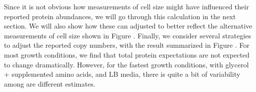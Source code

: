 \begin{figure}
\end{figure}

Since it is not obvious how measurements of cell size might have influenced
their reported protein abundances, we will go through this calculation in the
next section. We will also show how these can adjusted to better reflect the
alternative measurements of cell size shown in Figure
. Finally, we consider several strategies to
adjust the reported copy numbers, with the result summarized in Figure
. For most growth conditions, we find that
total protein expectations are not expected to change dramatically. However, for
the fastest growth conditions, with glycerol + supplemented amino acids, and LB
media, there is quite a bit of variability among are different estimates.



%

